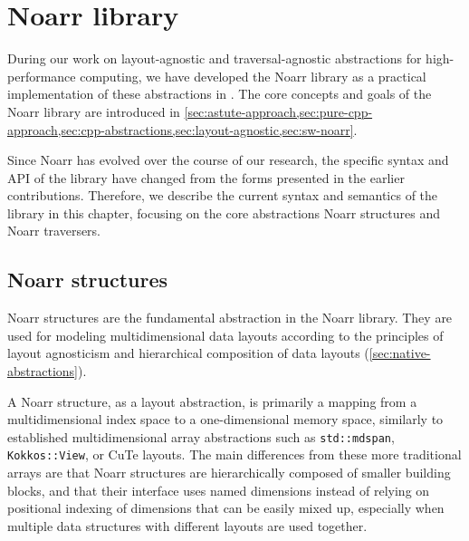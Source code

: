 \section{Noarr library}\label{chap:noarr}

During our work on layout-agnostic and traversal-agnostic abstractions for high-performance computing, we have developed the Noarr library as a practical implementation of these abstractions in \cpp. The core concepts and goals of the Noarr library are introduced in \cref{sec:astute-approach,sec:pure-cpp-approach,sec:cpp-abstractions,sec:layout-agnostic,sec:sw-noarr}.


Since Noarr has evolved over the course of our research, the specific syntax and API of the library have changed from the forms presented in the earlier contributions. Therefore, we describe the current syntax and semantics of the library in this chapter, focusing on the core abstractions Noarr structures and Noarr traversers.

\subsection{Noarr structures}\label{sec:noarr-structures}

Noarr structures are the fundamental abstraction in the Noarr library. They are used for modeling multidimensional data layouts according to the principles of layout agnosticism and hierarchical composition of data layouts (\cref{sec:native-abstractions}).

A Noarr structure, as a layout abstraction, is primarily a mapping from a multidimensional index space to a one-dimensional memory space, similarly to established multidimensional array abstractions such as \lstinline{std::mdspan}, \lstinline{Kokkos::View}, or CuTe layouts. The main differences from these more traditional arrays are that Noarr structures are hierarchically composed of smaller building blocks, and that their interface uses named dimensions instead of relying on positional indexing of dimensions that can be easily mixed up, especially when multiple data structures with different layouts are used together.

